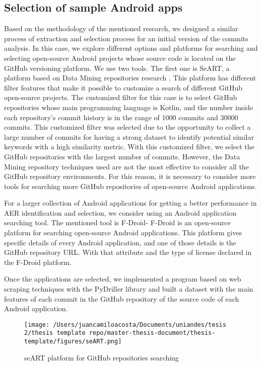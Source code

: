 \subsection{Selection of sample Android apps}
Based on the methodology of the mentioned research, we designed a similar process of extraction and selection process for an initial version of the commits analysis. In this case, we explore different options and platforms for searching and selecting open-source Android projects whose source code is located on the GitHub versioning platform. We use two tools. The first one is SeART, a platform based on Data Mining repositories research \citet{seart_platform}. This platform has different filter features that make it possible to customize a search of different GitHub open-source projects. The customized filter for this case is to select GitHub repositories whose main programming language is Kotlin, and the number inside each repository's commit history is in the range of 1000 commits and 30000 commits. This customized filter was selected due to the opportunity to collect a large number of commits for having a strong dataset to identify potential similar keywords with a high similarity metric. With this customized filter, we select the GitHub repositories with the largest number of commits. However, the Data Mining repository techniques used are not the most effective to consider all the GitHub repository environments. For this reason, it is necessary to consider more tools for searching more GitHub repositories of open-source Android applications.



For a larger collection of Android applications for getting a better performance in AER identification and selection, we consider using an Android application searching tool. The mentioned tool is F-Droid- F-Droid is an open-source platform for searching open-source Android applications. This platform gives specific details of every Android application, and one of those details is the GitHub repository URL. With that attribute and the type of license declared in the F-Droid platform.

Once the applications are selected, we implemented a program based on web scraping techniques with the PyDriller library and built a dataset with the main features of each commit in the GitHub repository of the source code of each Android application.

\begin{figure}[h]
    	\centering
    		\texttt{[image: /Users/juancamiloacosta/Documents/uniandes/tesis 2/thesis template repo/master-thesis-document/thesis-template/figures/seART.png]}
   			 \caption{seART platform for GitHub repositories searching \citet{seart_platform} }
   			 \label{fig:ast}
\end{figure}


